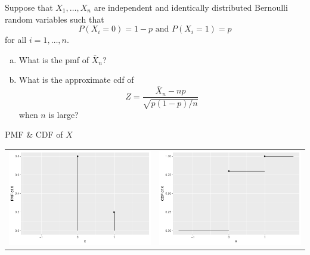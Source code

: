 \begin{frame}
  \begin{block}{\example}
    Suppose that $X_1,\ldots,X_n$ are independent and identically distributed Bernoulli random variables such that
    \[
      P(X_i=0)=1-p \mbox{ and } P(X_i=1)=p
    \]
    for all $i=1,\ldots,n$. 
    
    \begin{enumerate}[a)]
    \item What is the pmf of $\bar X_n$?
      
    \item What is the approximate cdf of
      \[
        Z=\frac{\bar X_n - np}{\sqrt{p(1-p)/n}}
      \]
      when $n$ is large?
    \end{enumerate}
  \end{block}
\end{frame}






\begin{frame}

  \begin{center}
    PMF \& CDF of $X$
    
      \begin{tabular}{cc}
      \includegraphics[width = .5\textwidth]{figure/clt1c-1} &
      \includegraphics[width = .5\textwidth]{figure/clt1c-2}
      \end{tabular}
  
  \end{center}
\end{frame}

